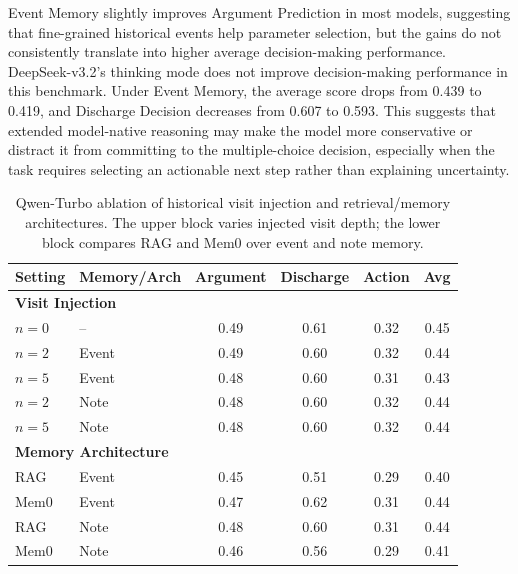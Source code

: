 Event Memory slightly improves Argument Prediction in most models, suggesting that fine-grained historical events help parameter selection, but the gains do not consistently translate into higher average decision-making performance. DeepSeek-v3.2's thinking mode does not improve decision-making performance in this benchmark. Under Event Memory, the average score drops from 0.439 to 0.419, and Discharge Decision decreases from 0.607 to 0.593. This suggests that extended model-native reasoning may make the model more conservative or distract it from committing to the multiple-choice decision, especially when the task requires selecting an actionable next step rather than explaining uncertainty.

\begin{table}[!h]
    \centering
    \caption{Qwen-Turbo ablation of historical visit injection and retrieval/memory architectures. The upper block varies injected visit depth; the lower block compares RAG and Mem0 over event and note memory.}
    \label{tab:decision_ablation}
    {\fontsize{9}{10.5}\selectfont
    \setlength{\tabcolsep}{4pt}
    \renewcommand{\arraystretch}{1.05}
    \begin{tabular*}{\textwidth}{ll@{\extracolsep{\fill}}cccc}
        \toprule
        \textbf{Setting} & \textbf{Memory/Arch} & \textbf{Argument} & \textbf{Discharge} & \textbf{Action} & \textbf{Avg} \\
        \midrule
        \multicolumn{6}{l}{\textbf{Visit Injection}} \\
        $n=0$ & -- & 0.49 & 0.61 & 0.32 & 0.45 \\
        $n=2$ & Event & 0.49 & 0.60 & 0.32 & 0.44 \\
        $n=5$ & Event & 0.48 & 0.60 & 0.31 & 0.43 \\
        $n=2$ & Note & 0.48 & 0.60 & 0.32 & 0.44 \\
        $n=5$ & Note & 0.48 & 0.60 & 0.32 & 0.44 \\
        \midrule
        \multicolumn{6}{l}{\textbf{Memory Architecture}} \\
        RAG & Event & 0.45 & 0.51 & 0.29 & 0.40 \\
        Mem0 & Event & 0.47 & 0.62 & 0.31 & 0.44 \\
        RAG & Note & 0.48 & 0.60 & 0.31 & 0.44 \\
        Mem0 & Note & 0.46 & 0.56 & 0.29 & 0.41 \\
        \bottomrule
    \end{tabular*}}
\end{table}

